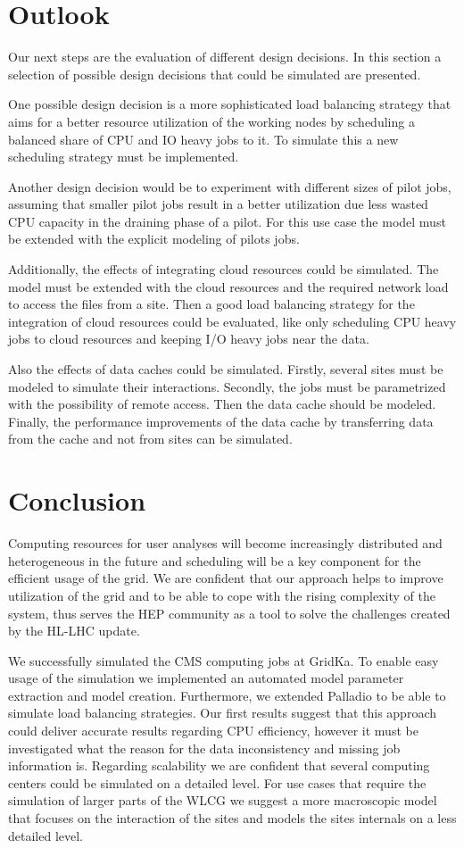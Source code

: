 \documentclass[a4paper]{jpconf}
\begin{document}
\section{Outlook}
\label{outlook}
Our next steps are the evaluation of different design decisions. In this section a selection of possible design decisions that could be simulated are presented.

One possible design decision is a more sophisticated load balancing strategy that aims for a better resource utilization of the working nodes by scheduling a balanced share of CPU and IO heavy jobs to it. To simulate this a new scheduling strategy must be implemented.

Another design decision would be to experiment with different sizes of pilot jobs, assuming that smaller pilot jobs result in a better utilization due less wasted CPU capacity in the draining phase of a pilot. For this use case the model must be extended with the explicit modeling of pilots jobs.

Additionally, the effects of integrating cloud resources could be simulated. The model must be extended with the cloud resources and the required network load to access the files from a site. Then a good load balancing strategy for the  integration of cloud resources could be evaluated, like only scheduling CPU heavy jobs to cloud resources and keeping I/O heavy jobs near the data.

Also the effects of data caches could be simulated. Firstly, several sites must be modeled to simulate their interactions. Secondly, the jobs must be parametrized with the possibility of remote access. Then the data cache should be modeled. Finally, the performance improvements of the data cache by transferring data from the cache and not from sites can be simulated.
\section{Conclusion}
\label{conlusion}

Computing resources for user analyses will become increasingly distributed and heterogeneous in the future and 
scheduling will be a key component for the efficient usage of the grid. We are confident that our approach helps to improve utilization of the grid and to be able to cope with the rising complexity of the system, thus serves the HEP community as a tool to solve the challenges created by the HL-LHC update.

We successfully simulated the CMS computing jobs at GridKa. To enable easy usage of the simulation we implemented an automated model parameter extraction and model creation. Furthermore, we extended Palladio to be able to simulate load balancing strategies. Our first results suggest that this approach could deliver accurate results regarding CPU efficiency, however it must be investigated what the reason for the data inconsistency and missing job information is. Regarding scalability we are confident that several computing centers could be simulated on a detailed level. For use cases that require the simulation of larger parts of the WLCG we suggest a more macroscopic model that focuses on the interaction of the sites and models the sites internals on a less detailed level.
\end{document}
